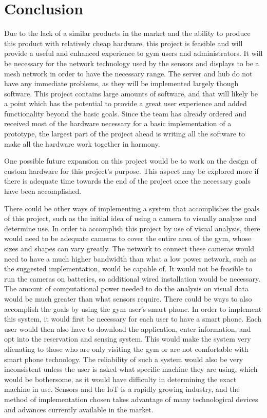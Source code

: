 \documentclass[PPFS.tex]{template/subfiles}
\begin{document}
\section{Conclusion}
Due to the lack of a similar products in the market and the ability to produce this product with relatively cheap hardware, this project is feasible and will provide a useful and enhanced experience to gym users and administrators. It will be necessary for the network technology used by the sensors and displays to be a mesh network in order to have the necessary range. The server and hub do not have any immediate problems, as they will be implemented largely though software. This project contains large amounts of software, and that will likely be a point which has the potential to provide a great user experience and added functionality beyond the basic goals. Since the team has already ordered and received most of the hardware necessary for a basic implementation of a prototype, the largest part of the project ahead is writing all the software to make all the hardware work together in harmony.

One possible future expansion on this project would be to work on the design of custom hardware for this project's purpose. This aspect may be explored more if there is adequate time towards the end of the project once the necessary goals have been accomplished.

There could be other ways of implementing a system that accomplishes the goals of this project, such as the initial idea of using a camera to visually analyze and determine use. In order to accomplish this project by use of visual analysis, there would need to be adequate cameras to cover the entire area of the gym, whose sizes and shapes can vary greatly. The network to connect these cameras would need to have a much higher bandwidth than what a low power network, such as the suggested implementation, would be capable of. It would not be feasible to run the cameras on batteries, so additional wired installation would be necessary. The amount of computational power needed to do the analysis on visual data would be much greater than what sensors require. There could be ways to also accomplish the goals by using the gym user's smart phone. In order to implement this system, it would first be necessary for each user to have a smart phone. Each user would then also have to download the application, enter information, and opt into the reservation and sensing system. This would make the system very alienating to those who are only visiting the gym or are not comfortable with smart phone technology. The reliability of such a system would also be very inconsistent unless the user is asked what specific machine they are using, which would be bothersome, as it would have difficulty in determining the exact machine in use. Sensors and the IoT is a rapidly growing industry, and the method of implementation chosen takes advantage of many technological devices and advances currently available in the market.
\end{document}
